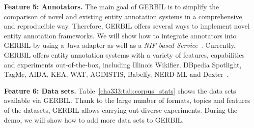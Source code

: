 \textbf{Feature 5: Annotators.}
The main goal of GERBIL is to simplify the comparison of novel and existing entity annotation systems in a comprehensive and reproducible way.
Therefore, GERBIL offers several  ways to implement novel entity annotation frameworks.
We will show how to integrate annotators into GERBIL by using a Java adapter as well as a \emph{NIF-based Service}~\cite{NIF}.%
Currently, GERBIL offers \overallGERBILannotators entity annotation systems with a variety of features, capabilities and experiments out-of-the-box, including Illinois Wikifier, DBpedia Spotlight, TagMe, AIDA, KEA, WAT, AGDISTIS, Babelfy, NERD-ML and Dexter~\cite{GERBIL}.   

\textbf{Feature 6: Data sets.}
Table~\ref{cha333:tab:corpus_stats} shows the \overalldatasets data sets available via GERBIL. 
Thank to the large number of formats, topics and features of the datasets, GERBIL allows carrying out diverse experiments. During the demo, we will show how to add more data sets to GERBIL.

